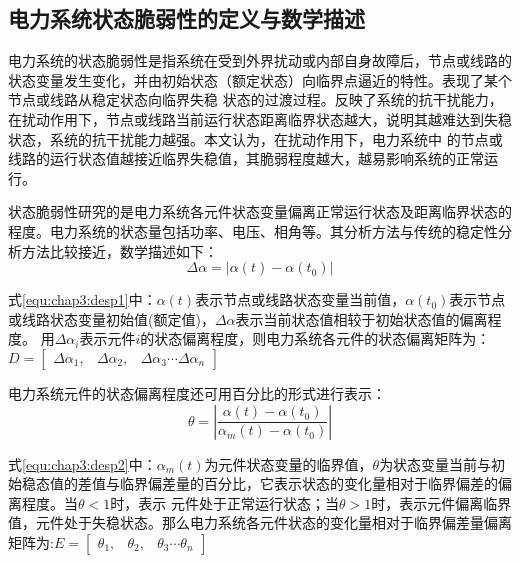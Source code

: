 \subsection{电力系统状态脆弱性的定义与数学描述}
\label{sec:vulneStaus}

电力系统的状态脆弱性是指系统在受到外界扰动或内部自身故障后，节点或线路的状态变量发生变化，并由初始状态（额定状态）向临界点逼近的特性。表现了某个节点或线路从稳定状态向临界失稳
状态的过渡过程。反映了系统的抗干扰能力，在扰动作用下，节点或线路当前运行状态距离临界状态越大，说明其越难达到失稳状态，系统的抗干扰能力越强。本文认为，在扰动作用下，电力系统中
的节点或线路的运行状态值越接近临界失稳值，其脆弱程度越大，越易影响系统的正常运行。

状态脆弱性研究的是电力系统各元件状态变量偏离正常运行状态及距离临界状态的程度。电力系统的状态量包括功率、电压、相角等。其分析方法与传统的稳定性分析方法比较接近，数学描述如下：
\begin{equation}
\label{equ:chap3:desp1}
\Delta \alpha=\left|\alpha(t)-\alpha\left(t_{0}\right)\right|  
\end{equation}

式\ref{equ:chap3:desp1}中：$\alpha(t)$表示节点或线路状态变量当前值，$\alpha\left(t_{0}\right)$表示节点或线路状态变量初始值(额定值)，$\Delta \alpha$表示当前状态值相较于初始状态值的偏离程度。
用$\Delta \alpha_i$表示元件$i$的状态偏离程度，则电力系统各元件的状态偏离矩阵为：$D=\left[\begin{array}{lll}{\Delta \alpha_{1},} & {\Delta \alpha_{2},} & {\Delta \alpha_{3} \cdots \Delta \alpha_{n}}\end{array}\right]$


电力系统元件的状态偏离程度还可用百分比的形式进行表示：
\begin{equation}
\label{equ:chap3:desp2}
  \theta=\left|\frac{\alpha(t)-\alpha\left(t_{0}\right)}{\alpha_{m}(t)-\alpha\left(t_{0}\right)}\right|
\end{equation}

式\ref{equ:chap3:desp2}中：$\alpha_{m}(t)$为元件状态变量的临界值，$\theta$为状态变量当前与初始稳态值的差值与临界偏差量的百分比，它表示状态的变化量相对于临界偏差的偏离程度。当$\theta<1$时，表示
元件处于正常运行状态；当$\theta>1$时，表示元件偏离临界值，元件处于失稳状态。那么电力系统各元件状态的变化量相对于临界偏差量偏离矩阵为:$E=\left[\begin{array}{lll}{\theta_{1},} & {\theta_{2},} & {\theta_{3} \cdots \theta_{n}}\end{array}\right]$


